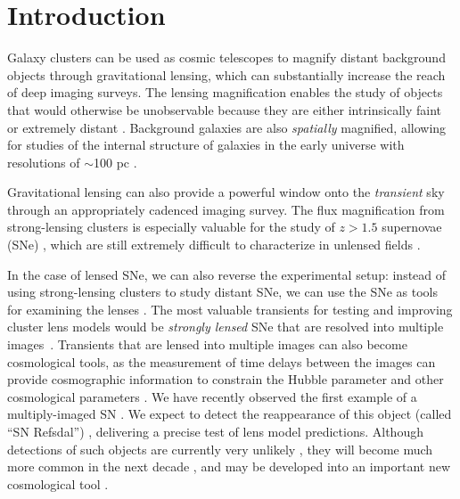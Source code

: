 
\section{Introduction}
\label{sec:Introduction}

Galaxy clusters can be used as cosmic telescopes to magnify distant
background objects through gravitational lensing, which can
substantially increase the reach of deep imaging surveys.  The lensing
magnification enables the study of objects that would otherwise be
unobservable because they are either intrinsically
faint \citep[e.g.][]{Schenker:2012,Alavi:2014} or extremely
distant \citep[e.g.][]{Franx:1997,Ellis:2001,Hu:2002,Kneib:2004,Richard:2006,Richard:2008,Bouwens:2009a,Maizy:2010,Zheng:2012,Coe:2013,Bouwens:2014,Zitrin:2014b}.
Background galaxies are also {\it spatially} magnified, allowing for
studies of the internal structure of galaxies in the early universe
with resolutions of $\sim$100
pc \citep[e.g.][]{Stark:2008,Jones:2010,Yuan:2011,Wuyts:2014,Livermore:2015}.

Gravitational lensing can also provide a powerful window onto the {\it
transient} sky through an appropriately cadenced imaging survey.  The
flux magnification from strong-lensing clusters is especially valuable
for the study of $z>1.5$ supernovae
(SNe) \citep[e.g.][]{Kovner:1988,Kolatt:1998,Sullivan:2000,Saini:2000,Gunnarsson:2003,Goobar:2009,Postman:2012},
which are still extremely difficult to characterize in unlensed
fields \citep[e.g.][]{Riess:2001,Riess:2007,Suzuki:2012,Rodney:2012,Rubin:2013,Jones:2013}.


In the case of lensed SNe, we can also reverse the experimental setup:
instead of using strong-lensing clusters to study distant SNe, we can
use the SNe as tools for examining the lenses \citep{Riehm:2011}.  The
most valuable transients for testing and improving cluster lens models
would be {\it strongly lensed} SNe that are resolved into multiple
images\ \citep{Holz:2001,Oguri:2003}.  Transients that are lensed into
multiple images can also become cosmological tools, as the measurement
of time delays between the images can provide cosmographic information
to constrain the Hubble parameter \citep{Refsdal:1964} and other
cosmological parameters \citep{Linder:2011}.  We have recently
observed the first example of a multiply-imaged SN \citep{Kelly:2015}.
We expect to detect the reappearance of this object (called ``SN
Refsdal'')  \citep{Oguri:2015,Sharon:2015,Diego:2015}, delivering a precise
test of lens model predictions.  Although detections of such objects
are currently very unlikely \citep{Li:2012}, they will become much
more common in the next decade \citep{Coe:2009,Dobke:2009}, and may be
developed into an important new cosmological
tool \citep{Oguri:2010,Linder:2011}.


